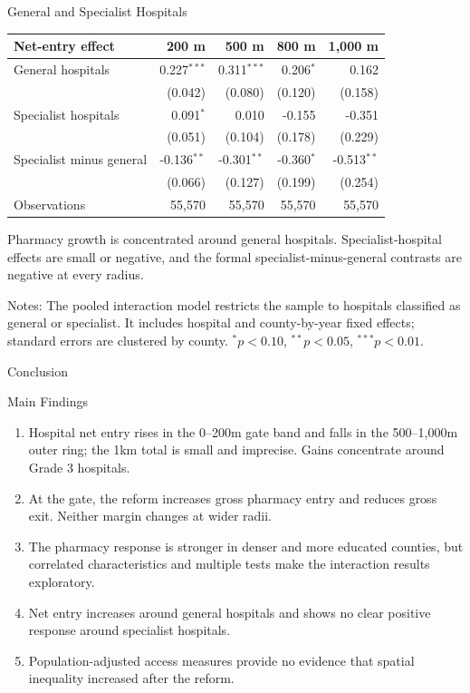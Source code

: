 \documentclass[aspectratio=169,11pt]{beamer}
\newcommand{\sectiondivider}[1]{%
  \begin{frame}
    \vfill
    \centering
    {\usebeamercolor[fg]{structure}\LARGE #1}
    \vfill
  \end{frame}%
}
\begin{document}
\begin{frame}{General and Specialist Hospitals}
\centering
\small
\setlength{\tabcolsep}{7pt}
\begin{tabular}{lrrrr}
\toprule
Net-entry effect & 200 m & 500 m & 800 m & 1,000 m \\
\midrule
General hospitals
& 0.227$^{***}$ & 0.311$^{***}$ & 0.206$^{*}$ & 0.162 \\
& (0.042) & (0.080) & (0.120) & (0.158) \\
Specialist hospitals
& 0.091$^{*}$ & 0.010 & -0.155 & -0.351 \\
& (0.051) & (0.104) & (0.178) & (0.229) \\
Specialist minus general
& -0.136$^{**}$ & -0.301$^{**}$ & -0.360$^{*}$ & -0.513$^{**}$ \\
& (0.066) & (0.127) & (0.199) & (0.254) \\
\midrule
Observations & 55,570 & 55,570 & 55,570 & 55,570 \\
\bottomrule
\end{tabular}

\vspace{0.7em}
\footnotesize Pharmacy growth is concentrated around general hospitals. Specialist-hospital effects are small or negative, and the formal specialist-minus-general contrasts are negative at every radius.
\par\vspace{0.25em}
\raggedright\scriptsize Notes: The pooled interaction model restricts the sample to hospitals classified as general or specialist. It includes hospital and county-by-year fixed effects; standard errors are clustered by county. $^{*}p<0.10$, $^{**}p<0.05$, $^{***}p<0.01$.
\end{frame}

\sectiondivider{Conclusion}
\begin{frame}{Main Findings}
\small
\begin{enumerate}\setlength\itemsep{0.55em}
  \item Hospital net entry rises in the 0--200m gate band and falls in the 500--1,000m outer ring; the 1km total is small and imprecise. Gains concentrate around Grade 3 hospitals.
  \item At the gate, the reform increases gross pharmacy entry and reduces gross exit. Neither margin changes at wider radii.
  \item The pharmacy response is stronger in denser and more educated counties, but correlated characteristics and multiple tests make the interaction results exploratory.
  \item Net entry increases around general hospitals and shows no clear positive response around specialist hospitals.
  \item Population-adjusted access measures provide no evidence that spatial inequality increased after the reform.
\end{enumerate}
\end{frame}
\end{document}
